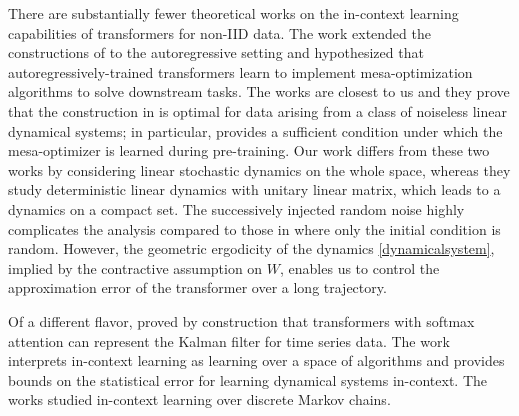 There are substantially fewer theoretical works on the in-context learning capabilities of transformers for non-IID data. The work \cite{von2023uncovering} extended the constructions of \cite{von2023transformers} to the autoregressive setting and hypothesized that autoregressively-trained transformers learn to implement mesa-optimization algorithms to solve downstream tasks. The works \cite{sander2024transformers, zheng2024mesa} are closest to us and they prove that the construction in \cite{von2023uncovering} is optimal for data arising from a class of noiseless linear dynamical systems; in particular, \cite{zheng2024mesa} provides a sufficient condition under which the mesa-optimizer is learned during pre-training. Our work differs from these two works by considering linear stochastic dynamics on the whole space, whereas they study deterministic linear dynamics with unitary linear matrix, which leads to a dynamics on a compact set. The successively injected random noise highly complicates the analysis compared to those in  \cite{zheng2024mesa} where only the initial condition is random. However, the geometric ergodicity of the dynamics  \eqref{dynamicalsystem}, implied by the contractive assumption on $W$, enables us to control the approximation error of the transformer over a long trajectory. 

Of a different flavor, \cite{goel2024can} proved by construction that transformers with softmax attention can represent the Kalman filter for time series data. The work \cite{li2023transformers} interprets in-context learning as learning over a space of algorithms and provides bounds on the statistical error for learning dynamical systems in-context. The works \cite{nichani2024transformers, edelman2024evolution} studied in-context learning over discrete Markov chains.